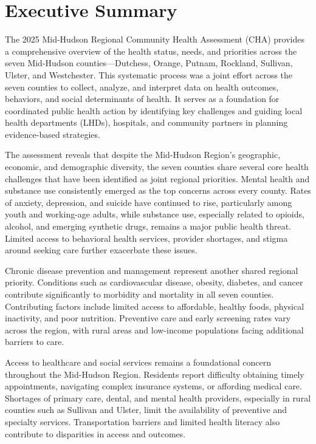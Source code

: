 \documentclass[
  english,
  letterpaper,
]{report}
\begin{document}

\chapter{Executive Summary}\label{executive-summary}

The 2025 Mid-Hudson Regional Community Health Assessment (CHA) provides
a comprehensive overview of the health status, needs, and priorities
across the seven Mid-Hudson counties---Dutchess, Orange, Putnam,
Rockland, Sullivan, Ulster, and Westchester. This systematic process was
a joint effort across the seven counties to collect, analyze, and
interpret data on health outcomes, behaviors, and social determinants of
health. It serves as a foundation for coordinated public health action
by identifying key challenges and guiding local health departments
(LHDs), hospitals, and community partners in planning evidence-based
strategies.

The assessment reveals that despite the Mid-Hudson Region's geographic,
economic, and demographic diversity, the seven counties share several
core health challenges that have been identified as joint regional
priorities. Mental health and substance use consistently emerged as the
top concerns across every county. Rates of anxiety, depression, and
suicide have continued to rise, particularly among youth and working-age
adults, while substance use, especially related to opioids, alcohol, and
emerging synthetic drugs, remains a major public health threat. Limited
access to behavioral health services, provider shortages, and stigma
around seeking care further exacerbate these issues.

Chronic disease prevention and management represent another shared
regional priority. Conditions such as cardiovascular disease, obesity,
diabetes, and cancer contribute significantly to morbidity and mortality
in all seven counties. Contributing factors include limited access to
affordable, healthy foods, physical inactivity, and poor nutrition.
Preventive care and early screening rates vary across the region, with
rural areas and low-income populations facing additional barriers to
care.

Access to healthcare and social services remains a foundational concern
throughout the Mid-Hudson Region. Residents report difficulty obtaining
timely appointments, navigating complex insurance systems, or affording
medical care. Shortages of primary care, dental, and mental health
providers, especially in rural counties such as Sullivan and Ulster,
limit the availability of preventive and specialty services.
Transportation barriers and limited health literacy also contribute to
disparities in access and outcomes.
\end{document}
